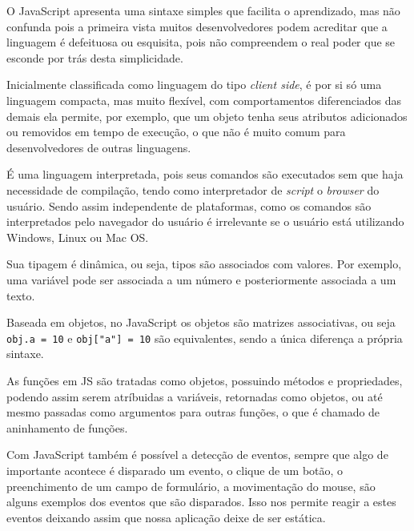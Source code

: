 \documentclass[
	12pt,				%
	openright,			%
	twoside,			%
	a4paper,			%
	english,			%
	brazil				%
	]{abntex2}
\begin{document}

O JavaScript apresenta uma sintaxe simples que facilita o aprendizado, mas não confunda pois a primeira vista muitos desenvolvedores podem acreditar que a linguagem é defeituosa ou esquisita, pois não compreendem o real poder que se esconde por trás desta simplicidade. 

Inicialmente classificada como linguagem do tipo \textit{client side}, é por si só uma linguagem compacta, mas muito flexível, com comportamentos diferenciados das demais ela permite, por exemplo, que um objeto tenha seus atributos adicionados ou removidos em tempo de execução, o que não é muito comum para desenvolvedores de outras linguagens.

É uma linguagem interpretada, pois seus comandos são executados sem que haja necessidade de compilação, tendo como interpretador de \textit{script} o \textit{browser} do usuário. Sendo assim independente de plataformas, como os comandos são interpretados pelo navegador do usuário é irrelevante se o usuário está utilizando Windows, Linux ou Mac OS.

Sua tipagem é dinâmica, ou seja, tipos são associados com valores. Por exemplo, uma variável pode ser associada a um número e posteriormente associada a um texto.

Baseada em objetos, no JavaScript os objetos são matrizes associativas, ou seja \verb|obj.a = 10| e \verb|obj["a"] = 10| são equivalentes, sendo a única diferença a própria sintaxe.

As funções em JS são tratadas como objetos, possuindo métodos e propriedades, podendo assim serem atríbuidas a variáveis, retornadas como objetos, ou até mesmo passadas como argumentos para outras funções, o que é chamado de aninhamento de funções.

Com JavaScript também é possível a detecção de eventos, sempre que algo de importante acontece é disparado um evento, o clique de um botão, o preenchimento de um campo de formulário, a movimentação do mouse, são alguns exemplos dos eventos que são disparados. Isso nos permite reagir a estes eventos deixando assim que nossa aplicação deixe de ser estática.
\end{document}
